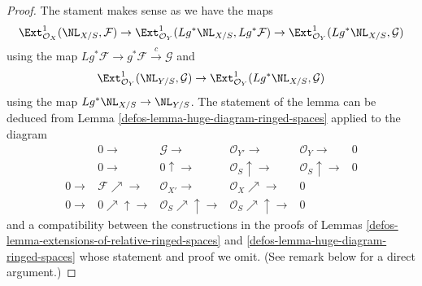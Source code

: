 \begin{proof}

The stament makes sense as we have the maps
$$
\Ext^1_{\mathcal{O}_X}(\NL_{X/S}, \mathcal{F}) \to
\Ext^1_{\mathcal{O}_Y}(Lg^*\NL_{X/S}, Lg^*\mathcal{F}) \to
\Ext^1_{\mathcal{O}_Y}(Lg^*\NL_{X/S}, \mathcal{G})
$$
using the map $Lg^*\mathcal{F} \to g^*\mathcal{F} \xrightarrow{c} \mathcal{G}$
and
$$
\Ext^1_{\mathcal{O}_Y}(\NL_{Y/S}, \mathcal{G}) \to
\Ext^1_{\mathcal{O}_Y}(Lg^*\NL_{X/S}, \mathcal{G})
$$
using the map $Lg^*\NL_{X/S} \to \NL_{Y/S}$.
The statement of the lemma can be deduced from
Lemma \ref{defos-lemma-huge-diagram-ringed-spaces} applied to the diagram
$$
\begin{array}{cccccc} & 0 \longrightarrow & \mathcal{G} \longrightarrow & \mathcal{O}_{Y'} \longrightarrow & \mathcal{O}_Y \longrightarrow & 0 \\  & 0 \longrightarrow & 0 \uparrow\longrightarrow & \mathcal{O}_S \uparrow\longrightarrow & \mathcal{O}_S \uparrow\longrightarrow & 0 \\ 0 \longrightarrow & \mathcal{F} \nearrow\longrightarrow & \mathcal{O}_{X'} \longrightarrow & \mathcal{O}_X \nearrow\longrightarrow & 0 &  \\ 0 \longrightarrow & 0 \nearrow\uparrow\longrightarrow & \mathcal{O}_S \nearrow\uparrow\longrightarrow & \mathcal{O}_S \nearrow\uparrow\longrightarrow & 0 & \end{array}
$$
and a compatibility between the constructions in the proofs
of Lemmas \ref{defos-lemma-extensions-of-relative-ringed-spaces} and
\ref{defos-lemma-huge-diagram-ringed-spaces}
whose statement and proof we omit. (See remark below for a direct argument.)
\end{proof}

